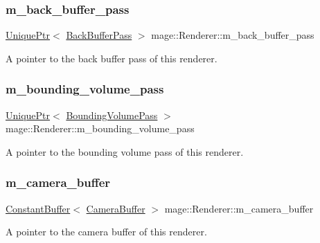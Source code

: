 \subsubsection{\texorpdfstring{m\+\_\+back\+\_\+buffer\+\_\+pass}{m\_back\_buffer\_pass}}
{\footnotesize\ttfamily \hyperlink{namespacemage_a3316d7143a973e37adf1110f2e80ca31}{Unique\+Ptr}$<$ \hyperlink{classmage_1_1_back_buffer_pass}{Back\+Buffer\+Pass} $>$ mage\+::\+Renderer\+::m\+\_\+back\+\_\+buffer\+\_\+pass\hspace{0.3cm}{\ttfamily [private]}}

A pointer to the back buffer pass of this renderer. \hypertarget{classmage_1_1_renderer_a36271439a6217d1fd9b9162f5d90b738}{}\label{classmage_1_1_renderer_a36271439a6217d1fd9b9162f5d90b738} 
\subsubsection{\texorpdfstring{m\+\_\+bounding\+\_\+volume\+\_\+pass}{m\_bounding\_volume\_pass}}
{\footnotesize\ttfamily \hyperlink{namespacemage_a3316d7143a973e37adf1110f2e80ca31}{Unique\+Ptr}$<$ \hyperlink{classmage_1_1_bounding_volume_pass}{Bounding\+Volume\+Pass} $>$ mage\+::\+Renderer\+::m\+\_\+bounding\+\_\+volume\+\_\+pass\hspace{0.3cm}{\ttfamily [private]}}

A pointer to the bounding volume pass of this renderer. \hypertarget{classmage_1_1_renderer_ac6ea5b2ff22e051400a693b3f98ef816}{}\label{classmage_1_1_renderer_ac6ea5b2ff22e051400a693b3f98ef816} 
\subsubsection{\texorpdfstring{m\+\_\+camera\+\_\+buffer}{m\_camera\_buffer}}
{\footnotesize\ttfamily \hyperlink{structmage_1_1_constant_buffer}{Constant\+Buffer}$<$ \hyperlink{structmage_1_1_camera_buffer}{Camera\+Buffer} $>$ mage\+::\+Renderer\+::m\+\_\+camera\+\_\+buffer\hspace{0.3cm}{\ttfamily [private]}}

A pointer to the camera buffer of this renderer. \hypertarget{classmage_1_1_renderer_a263748ea2ded028b1885f122e62caf39}{}\label{classmage_1_1_renderer_a263748ea2ded028b1885f122e62caf39} 
